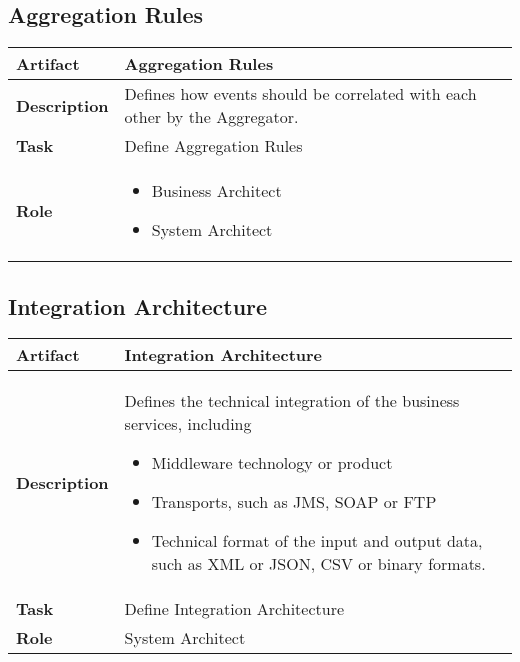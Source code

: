 \subsection{Aggregation Rules}

\begin{tabularx}{\textwidth}{@{} l X @{}}
	\caption{Aggregation Rules} \label{table:ch6_Artifact_Aggregation_Rules}\\
	\toprule 
	\bfseries Artifact & Aggregation Rules\\
	\midrule 
	\bfseries Description & Defines how events should be correlated with each other by the Aggregator.\\
	\midrule 
	\bfseries Task & Define Aggregation Rules
		\\
	\midrule 
	\bfseries Role & 
	\begin{itemize}
		\item Business Architect
		\item System Architect
	\end{itemize}
	\\
	\bottomrule 
\end{tabularx}


\subsection{Integration Architecture}

\begin{tabularx}{\textwidth}{@{} l X @{}}
	\caption{Integration Architecture} \label{table:ch6_Artifact_Integration_Architecture}\\
	\toprule 
	\bfseries Artifact & Integration Architecture\\
	\midrule 
	\bfseries Description & Defines the technical integration of the business services, including
	\begin{itemize}
		\item Middleware technology or product
		\item Transports, such as \ac{JMS}, SOAP or \ac{FTP}
		\item Technical format of the input and output data, such as \ac{XML} or \ac{JSON}, \ac{CSV} or binary formats.
	\end{itemize}
	\\
	\midrule 
	\bfseries Task & Define Integration Architecture 
		\\
	\midrule 
	\bfseries Role & System Architect\\
	\bottomrule 
\end{tabularx}



